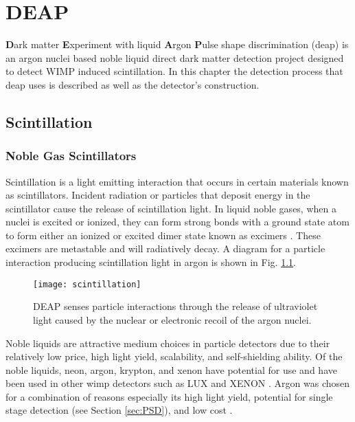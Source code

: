 \chapter{DEAP}
\label{chap:DEAP}
\textbf{D}ark matter \textbf{E}xperiment with liquid \textbf{A}rgon \textbf{P}ulse shape discrimination (\gls{deap}) is an argon nuclei based noble liquid direct dark matter detection project designed to detect WIMP induced scintillation. In this chapter the detection process that \gls{deap} uses is described as well as the detector's construction.

\section{Scintillation}

\subsection{Noble Gas Scintillators}
Scintillation is a light emitting interaction that occurs in certain materials known as scintillators. Incident radiation or particles that deposit energy in the scintillator cause the release of scintillation light. In liquid noble gases, when a nuclei is excited or ionized, they can form strong bonds with a ground state atom to form either an ionized or excited dimer state known as excimers \cite{mullikenNobleScintillation}. These excimers are metastable and will radiatively decay. A diagram for a particle interaction producing scintillation light in argon is shown in Fig. \ref{Fig:scintillation}.
\begin{figure}[ht]
\centering
\texttt{[image: scintillation]}
\caption{DEAP senses particle interactions through the release of ultraviolet light caused by the nuclear or electronic recoil of the argon nuclei.}
\label{Fig:scintillation}
\end{figure}

Noble liquids are attractive medium choices in particle detectors due to their relatively low price, high light yield, scalability, and self-shielding ability. Of the noble liquids, neon, argon, krypton, and xenon have potential for use and have been used in other \gls{wimp} detectors such as LUX \cite{LUX2015Results} and XENON \cite{XENON100}. Argon was chosen for a combination of reasons especially its high light yield, potential for single stage detection (see Section \ref{sec:PSD}), and low cost \cite{2004BouleyPSD} \cite{deap3DarkMatterSearch} \cite{argonScintillation}.

